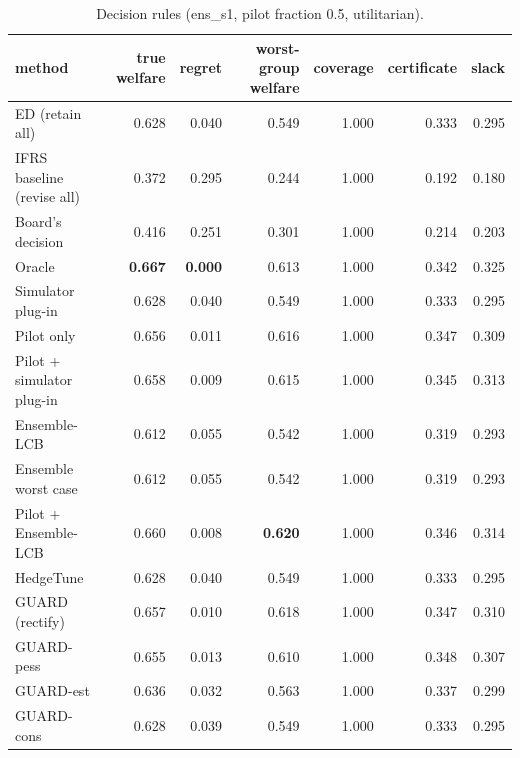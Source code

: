 \begin{table}[t]
\centering
\small
\begin{tabular}{lrrrrrr}
\toprule
method & true welfare & regret & worst-group welfare & coverage & certificate & slack \\
\midrule
ED (retain all) & 0.628 & 0.040 & 0.549 & 1.000 & 0.333 & 0.295 \\
IFRS baseline (revise all) & 0.372 & 0.295 & 0.244 & 1.000 & 0.192 & 0.180 \\
Board's decision & 0.416 & 0.251 & 0.301 & 1.000 & 0.214 & 0.203 \\
Oracle & \textbf{0.667} & \textbf{0.000} & 0.613 & 1.000 & 0.342 & 0.325 \\
Simulator plug-in & 0.628 & 0.040 & 0.549 & 1.000 & 0.333 & 0.295 \\
Pilot only & 0.656 & 0.011 & 0.616 & 1.000 & 0.347 & 0.309 \\
Pilot + simulator plug-in & 0.658 & 0.009 & 0.615 & 1.000 & 0.345 & 0.313 \\
Ensemble-LCB & 0.612 & 0.055 & 0.542 & 1.000 & 0.319 & 0.293 \\
Ensemble worst case & 0.612 & 0.055 & 0.542 & 1.000 & 0.319 & 0.293 \\
Pilot + Ensemble-LCB & 0.660 & 0.008 & \textbf{0.620} & 1.000 & 0.346 & 0.314 \\
HedgeTune & 0.628 & 0.040 & 0.549 & 1.000 & 0.333 & 0.295 \\
GUARD (rectify) & 0.657 & 0.010 & 0.618 & 1.000 & 0.347 & 0.310 \\
GUARD-pess & 0.655 & 0.013 & 0.610 & 1.000 & 0.348 & 0.307 \\
GUARD-est & 0.636 & 0.032 & 0.563 & 1.000 & 0.337 & 0.299 \\
GUARD-cons & 0.628 & 0.039 & 0.549 & 1.000 & 0.333 & 0.295 \\
\bottomrule
\end{tabular}
\caption{Decision rules (ens\_s1, pilot fraction 0.5, utilitarian).}
\label{tab:methods-utilitarian}
\end{table}
